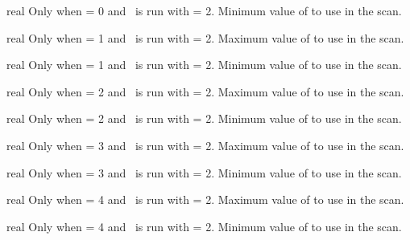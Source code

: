 \myhrule

{real}
{Only when  = 0 and \sfincsScan~is run with  = 2.}
{Minimum value of  to use in the scan.}

\myhrule

{real}
{Only when  = 1 and \sfincsScan~is run with  = 2.}
{Maximum value of  to use in the scan.}

\myhrule

{real}
{Only when  = 1 and \sfincsScan~is run with  = 2.}
{Minimum value of  to use in the scan.}

\myhrule

{real}
{Only when  = 2 and \sfincsScan~is run with  = 2.}
{Maximum value of  to use in the scan.}

\myhrule

{real}
{Only when  = 2 and \sfincsScan~is run with  = 2.}
{Minimum value of  to use in the scan.}

\myhrule

{real}
{Only when  = 3 and \sfincsScan~is run with  = 2.}
{Maximum value of  to use in the scan.}

\myhrule

{real}
{Only when  = 3 and \sfincsScan~is run with  = 2.}
{Minimum value of  to use in the scan.}

\myhrule

{real}
{Only when  = 4 and \sfincsScan~is run with  = 2.}
{Maximum value of  to use in the scan.}

\myhrule

{real}
{Only when  = 4 and \sfincsScan~is run with  = 2.}
{Minimum value of  to use in the scan.}

